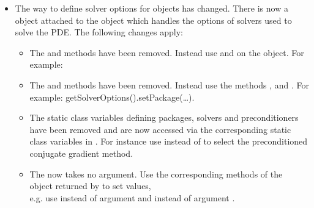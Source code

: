\begin{itemize}
\item The way to define solver options for \LinearPDE objects has changed.
    There is now a \SolverOptions object attached to the \LinearPDE
    object which handles the options of solvers used to solve the PDE.
    The following changes apply:  
 \begin{itemize}
  \item The  and  methods
      have been removed. Instead use  and
       on the \SolverOptions object. For example:
  \item The  and  methods have
      been removed. Instead use the methods ,
       and . For example:
      getSolverOptions().setPackage(\ldots).
  \item The static class variables defining packages, solvers and
      preconditioners have been removed and are now accessed via the
      corresponding static class variables in \SolverOptions.
      For instance use  instead of
       to select the preconditioned conjugate gradient
      method.
  \item The  now takes no argument. Use the corresponding
      methods of the\\ \SolverOptions object returned by
       to set values,\\ e.g. use
       instead of argument
       and 
      instead of argument .
 \end{itemize}
\end{itemize}


